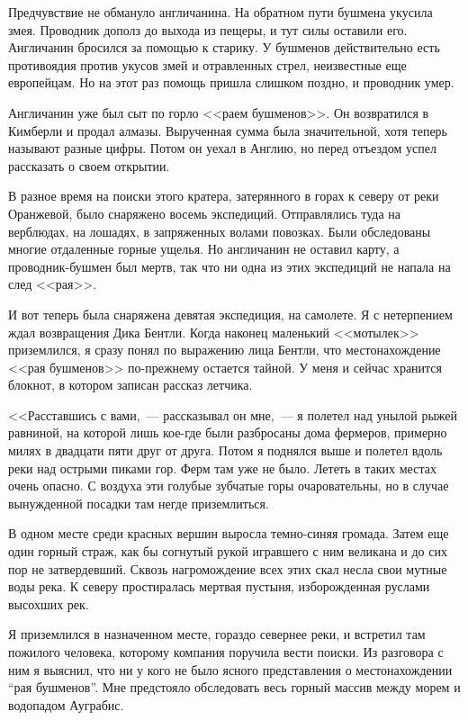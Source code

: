 \documentclass[12pt,a4paper,twoside,openany,svgnames]{memoir}
\begin{document}
Предчувствие не обмануло англичанина. На обратном пути бушмена укусила змея. Проводник дополз до выхода из пещеры, и тут силы оставили его. Англичанин бросился за помощью к старику. У бушменов действительно есть противоядия против укусов змей и отравленных стрел, неизвестные еще европейцам. Но на этот раз помощь пришла слишком поздно, и проводник умер.

Англичанин уже был сыт по горло <<раем бушменов>>. Он возвратился в Кимберли и продал алмазы. Вырученная сумма была значительной, хотя теперь называют разные цифры. Потом он уехал в Англию, но перед отъездом успел рассказать о своем открытии.

В разное время на поиски этого кратера, затерянного в горах к северу от реки Оранжевой, было снаряжено восемь экспедиций. Отправлялись туда на верблюдах, на лошадях, в запряженных волами повозках. Были обследованы многие отдаленные горные ущелья. Но англичанин не оставил карту, а проводник-бушмен был мертв, так что ни одна из этих экспедиций не напала на след <<рая>>.

И вот теперь была снаряжена девятая экспедиция, на самолете. Я с нетерпением ждал возвращения Дика Бентли. Когда наконец маленький <<мотылек>> приземлился, я сразу понял по выражению лица Бентли, что местонахождение <<рая бушменов>> по-прежнему остается тайной. У меня и сейчас хранится блокнот, в котором записан рассказ летчика.

<<Расставшись с вами,~--- рассказывал он мне,~--- я полетел над унылой рыжей равниной, на которой лишь кое-где были разбросаны дома фермеров, примерно милях в двадцати пяти друг от друга. Потом я поднялся выше и полетел вдоль реки над острыми пиками гор. Ферм там уже не было. Лететь в таких местах очень опасно. С воздуха эти голубые зубчатые горы очаровательны, но в случае вынужденной посадки там негде приземлиться.

В одном месте среди красных вершин выросла темно-синяя громада. Затем еще один горный страж, как бы согнутый рукой игравшего с ним великана и до сих пор не затвердевший. Сквозь нагромождение всех этих скал несла свои мутные воды река. К северу простиралась мертвая пустыня, изборожденная руслами высохших рек.

Я приземлился в назначенном месте, гораздо севернее реки, и встретил там пожилого человека, которому компания поручила вести поиски. Из разговора с ним я выяснил, что ни у кого не было ясного представления о местонахождении ``рая бушменов''. Мне предстояло обследовать весь горный массив между морем и водопадом Ауграбис.
\end{document}
